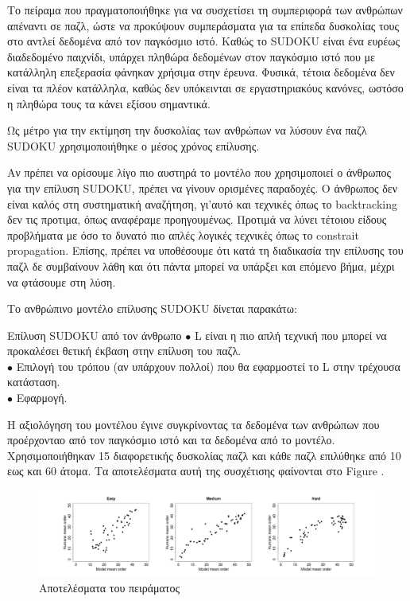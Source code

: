 \documentclass[12pt]{book}
\theoremstyle{definition}
\begin{document}
Το πείραμα που πραγματοποιήθηκε για να συσχετίσει τη συμπεριφορά των ανθρώπων απέναντι σε παζλ, ώστε να προκύψουν συμπεράσματα για τα επίπεδα δυσκολίας τους στο \cite{5} αντλεί δεδομένα από τον παγκόσμιο ιστό. Καθώς το SUDOKU είναι ένα ευρέως διαδεδομένο παιχνίδι, υπάρχει πληθώρα δεδομένων στον παγκόσμιο ιστό που με κατάλληλη επεξερασία φάνηκαν χρήσιμα στην έρευνα. Φυσικά, τέτοια δεδομένα δεν είναι τα πλέον κατάλληλα, καθώς δεν υπόκεινται σε εργαστηριακόυς κανόνες, ωστόσο η πληθώρα τους τα κάνει εξίσου σημαντικά. \par

Ως μέτρο για την εκτίμηση την δυσκολίας των ανθρώπων να λύσουν ένα παζλ SUDOKU χρησιμοποιήθηκε ο μέσος χρόνος επίλυσης.

Αν πρέπει να ορίσουμε λίγο πιο αυστηρά το μοντέλο που χρησιμοποιεί ο άνθρωπος για την επίλυση SUDOKU, πρέπει να γίνουν ορισμένες παραδοχές. Ο άνθρωπος δεν είναι καλός στη συστηματική αναζήτηση, γι'αυτό και τεχνικές όπως το backtracking δεν τις προτιμα, όπως αναφέραμε προηγουμένως. Προτιμά να λύνει τέτοιου είδους προβλήματα με όσο το δυνατό πιο απλές λογικές τεχνικές όπως το constrait propagation. Επίσης, πρέπει να υποθέσουμε ότι κατά τη διαδικασία την επίλυσης του παζλ δε συμβαίνουν λάθη και ότι πάντα μπορεί να υπάρξει και επόμενο βήμα, μέχρι να φτάσουμε στη λύση. \par

Το ανθρώπινο μοντέλο επίλυσης SUDOKU δίνεται παρακάτω:

\begin{mytheorem}{Επίλυση SUDOKU από τον άνθρωπο}{}
	\(\bullet\) L είναι η πιο απλή τεχνική που μπορεί να προκαλέσει θετική έκβαση στην επίλυση του παζλ. \\
	\(\bullet\) Επιλογή του τρόπου (αν υπάρχουν πολλοί) που θα εφαρμοστεί το L στην τρέχουσα κατάσταση. \\
	\(\bullet\) Εφαρμογή. \\
\end{mytheorem}

Η αξιολόγηση του μοντέλου έγινε συγκρίνοντας τα δεδομένα των ανθρώπων που προέρχονταο από τον παγκόσμιο ιστό και τα δεδομένα από το μοντέλο. Χρησιμοποιήθηκαν 15 διαφορετικής δυσκολίας παζλ και κάθε παζλ επιλύθηκε από 10 εως και 60 άτομα. Τα αποτελέσματα αυτή της συσχέτισης φαίνονται στο Figure . \par

\begin{figure}[h]
	\centering
	\includegraphics[scale=0.4]{Figures/results.png}
	\caption{Αποτελέσματα του πειράματος \cite{5}}
\end{figure}
\end{document}
